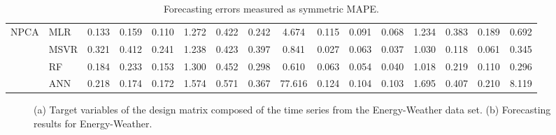 \documentclass[conference]{IEEEtran}
\begin{document}
\begin{table*}
\begin{tabular}{|p{0.8cm}|p{0.8cm}||c|c||c|c|c|c|c|c|c|c|c|c|c|c|}
\cline{2-16}
\hline
\hline
\multirow{4}{*}{NPCA} &MLR &   0.133 &    0.159 &    0.110 &    1.272 &    0.422 &    0.242 &    4.674 &    0.115 &    0.091 &    0.068 &    1.234 &    0.383 &    0.189 &    0.692\\
\cline{2-16}
 &MSVR &   0.321 &    0.412 &    0.241 &    1.238 &    0.423 &    0.397 &    0.841 &    0.027 &    0.063 &    0.037 &    1.030 &    0.118 &    0.061 &    0.345\\
\cline{2-16}
 &RF &   0.184 &    0.233 &    0.153 &    1.300 &    0.452 &    0.298 &    0.610 &    0.063 &    0.054 &    0.040 &    1.018 &    0.219 &    0.110 &    0.296\\
\cline{2-16}
 &ANN &   0.218 &    0.174 &    0.172 &    1.574 &    0.571 &    0.367 &    77.616 &    0.124 &    0.104 &    0.103 &    1.695 &    0.407 &    0.210 &    8.119\\
\cline{2-16}
\hline
\end{tabular}
\caption{Forecasting errors measured as symmetric MAPE.}
\label{fg:feature_selection_res}
\end{table*}


\begin{figure}
\centering
\caption{(a) Target variables of the design matrix composed of the time series from the  Energy-Weather data set.
 (b) Forecasting results for	Energy-Weather.}\label{fg:target_data}
\end{figure}
\end{document}
